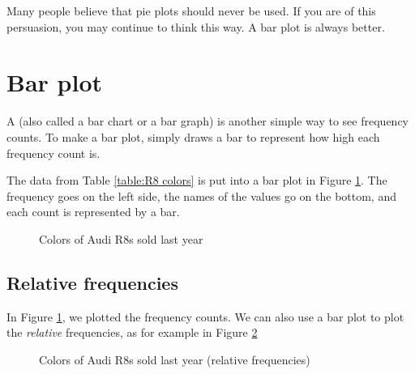 \documentclass[../../../main.tex]{subfiles}
\begin{document}
Many people believe that pie plots should never be used. If you are of this persuasion, you may continue to think this way. A bar plot is always better.


\section{Bar plot}

A  (also called a bar chart or a bar graph) is another simple way to see frequency counts. To make a bar plot, simply draws a bar to represent how high each frequency count is.

The data from Table \ref{table:R8 colors} is put into a bar plot in Figure \ref{plot:R8 colors bar plot}. The frequency goes on the left side, the names of the values go on the bottom, and each count is represented by a bar.

\begin{figure}[ht]
  \caption{\label{plot:R8 colors bar plot} Colors of Audi R8s sold last year}
\end{figure}


\subsection{Relative frequencies}

In Figure \ref{plot:R8 colors bar plot}, we plotted the frequency counts. We can also use a bar plot to plot the \emph{relative} frequencies, as for example in Figure \ref{plot:R8 colors relative frequencies bar plot}

\begin{figure}[ht]
  \caption{\label{plot:R8 colors relative frequencies bar plot} Colors of Audi R8s sold last year (relative frequencies)}
\end{figure}
\end{document}
